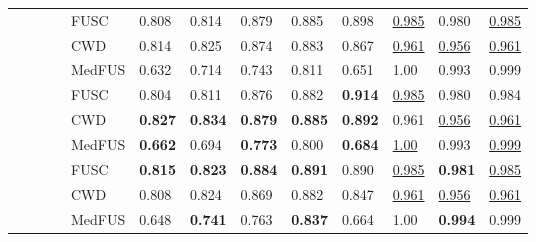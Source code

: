 \documentclass[review]{elsarticle}
\begin{document}
\begin{table*}[!h]
{\begin{tabular}{|l|l|l|l|l|l|l|l|l|l|l|l|l|}
			\checkmark&&\checkmark&\checkmark  & FUSC    &0.808    &0.814   &0.879     &0.885    & 0.898   & \underline{0.985}  &0.980    &\underline{0.985}   \\ \cline{5-13} 
			&&&& CWD     &0.814    &0.825   &0.874     &0.883    & 0.867   & \underline{0.961}  &\underline{0.956}    &\underline{0.961}   \\ \cline{5-13}
			&&&& MedFUS    &0.632   &0.714   &0.743   &0.811    &0.651    &1.00   &0.993 & 0.999 \\ \hline
			
			\checkmark&\checkmark&\checkmark& & FUSC    &0.804    &0.811   &0.876     &0.882    &\textbf{ 0.914}   & \underline{0.985}  &0.980    &0.984   \\ \cline{5-13} 
			&&&& CWD     &\textbf{0.827}    &\textbf{0.834}   &\textbf{0.879}     &\textbf{0.885 }   & \textbf{0.892}   & 0.961  &\underline{0.956}    &\underline{0.961}   \\ \cline{5-13}
			&&&& MedFUS    & \textbf{0.662}  & 0.694  &\textbf{0.773}   &0.800    &\textbf{0.684}    &\underline{1.00}   &0.993  &\underline{0.999}  \\ \hline
			
			\checkmark&\checkmark&\checkmark&\checkmark  & FUSC    &\textbf{0.815}    &\textbf{0.823}   &\textbf{0.884}     &\textbf{0.891}    & 0.890   & \underline{0.985}  &\textbf{0.981}    &\underline{0.985}   \\ \cline{5-13} 
			&&&& CWD     &0.808    &0.824   &0.869     &0.882    & 0.847   & \underline{0.961}  &\underline{0.956}    &\underline{0.961}   \\ \cline{5-13}
			&&&& MedFUS    &0.648    &\textbf{0.741}   & 0.763   &\textbf{0.837}  & 0.664   &1.00   &\textbf{0.994}    &0.999 \\ \hline
	\end{tabular}}
\end{table*}
\end{document}

